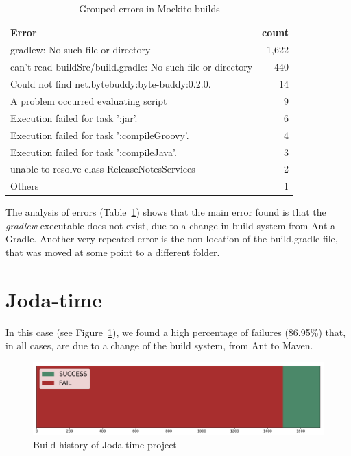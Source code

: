\begin{table}
	\caption{Grouped errors in Mockito builds}
	\label{table:mockitoErrors}
	\begin{center}
	\begin{tabular}{lr}
		\toprule
		\bf{Error} & \bf{count} \\ 
		\midrule
			gradlew: No such file or directory & 1,622 \\
			can't read buildSrc/build.gradle: No such file or directory & 440 \\
			Could not find net.bytebuddy:byte-buddy:0.2.0. & 14 \\
			A problem occurred evaluating script & 9 \\
			Execution failed for task ':jar'. & 6 \\
			Execution failed for task ':compileGroovy'.& 4 \\
			Execution failed for task ':compileJava'. &	3 \\
			unable to resolve class ReleaseNotesServices & 2 \\
			Others & 1 \\
		\bottomrule
	\end{tabular}
	\end{center}
\end{table}

The analysis of errors (Table~\ref{table:mockitoErrors}) shows that the main error found is that the \emph{gradlew} executable does not exist, due to a change in build system from Ant a Gradle.
Another very repeated error is the non-location of the build.gradle file, that was moved at some point to a different folder.


\section{Joda-time}

In this case (see Figure~\ref{fig:timeHist}), we found a high percentage of failures (86.95\%) that, in all cases, are due to a change of the build system, from Ant to Maven.

\begin{figure}[h]
	\begin{center}
		\includegraphics[width=\linewidth]{charts/TimeHist}
		\caption{Build history of Joda-time project}
		\label{fig:timeHist}
	\end{center}
\end{figure}

